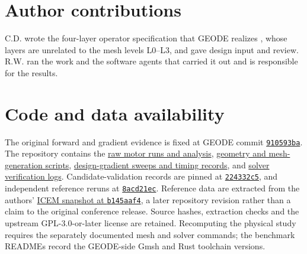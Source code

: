 \documentclass{anvil-paper}
\begin{document}
\section*{Author contributions}
C.D. wrote the four-layer operator specification that GEODE realizes
\citep{dunnavant2026whiteroom}, whose layers are unrelated to the mesh
levels L0--L3, and gave design input and review. R.W. ran the work and the
software agents that carried it out and is responsible for the results.

\section*{Code and data availability}
The original forward and gradient evidence is fixed at GEODE commit
\href{https://github.com/rjwalters/geode-fem/tree/910593bad6f64f9f01671c2632b57034e72b9c61}{\texttt{910593ba}}.
The repository contains the
\href{https://github.com/rjwalters/geode-fem/tree/910593bad6f64f9f01671c2632b57034e72b9c61/benchmarks/motor_reference/forward_harmonic}{raw motor runs and analysis},
\href{https://github.com/rjwalters/geode-fem/tree/910593bad6f64f9f01671c2632b57034e72b9c61/benchmarks/motor_reference/geometry}{geometry and mesh-generation scripts},
\href{https://github.com/rjwalters/geode-fem/tree/910593bad6f64f9f01671c2632b57034e72b9c61/benchmarks/motor_shape_gradient/design}{design-gradient sweeps and timing records},
and \href{https://github.com/rjwalters/geode-fem/tree/910593bad6f64f9f01671c2632b57034e72b9c61/benchmarks/motor_nonlinear_m1}{solver verification logs}.
Candidate-validation records are pinned at
\href{https://github.com/rjwalters/geode-fem/tree/224332c526be1191183af82b610973c7778de720/benchmarks/motor_validation}{\texttt{224332c5}},
and independent reference reruns at
\href{https://github.com/rjwalters/geode-fem/tree/8acd21ecf85d89fe077275a3c04ca70b53963d43/benchmarks/motor_reference/reference_refinement}{\texttt{8acd21ec}}.
Reference data are extracted from the authors'
\href{https://github.com/MichaelWiesheu/ICEMsnapshot/tree/b145aaf4ab1a6424828bc941eaf172f48fa0d458}{ICEM snapshot at \texttt{b145aaf4}},
a later repository revision rather than a claim to the original conference
release. Source hashes, extraction checks and the upstream GPL-3.0-or-later license
are retained. Recomputing the physical study requires the separately
documented mesh and solver commands; the benchmark READMEs record the
GEODE-side Gmsh and Rust toolchain versions.
\end{document}
